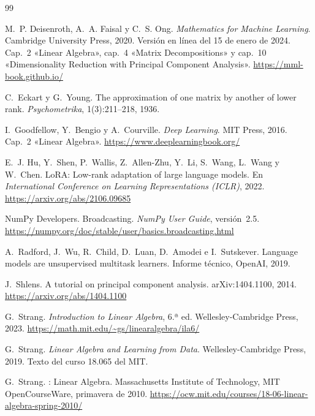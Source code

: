 \begin{thebibliography}{99}
\small

M.~P. Deisenroth, A.~A. Faisal y C.~S. Ong.
\newblock \emph{Mathematics for Machine Learning}.
\newblock Cambridge University Press, 2020. Versión en línea del 15 de enero de 2024.
\newblock Cap.~2 «Linear Algebra», cap.~4 «Matrix Decompositions» y cap.~10 «Dimensionality Reduction with Principal Component Analysis».
\newblock \url{https://mml-book.github.io/}

C.~Eckart y G.~Young.
\newblock The approximation of one matrix by another of lower rank.
\newblock \emph{Psychometrika}, 1(3):211--218, 1936.

I.~Goodfellow, Y.~Bengio y A.~Courville.
\newblock \emph{Deep Learning}.
\newblock MIT Press, 2016. Cap.~2 «Linear Algebra».
\newblock \url{https://www.deeplearningbook.org/}

E.~J. Hu, Y.~Shen, P.~Wallis, Z.~Allen-Zhu, Y.~Li, S.~Wang, L.~Wang y W.~Chen.
\newblock LoRA: Low-rank adaptation of large language models.
\newblock En \emph{International Conference on Learning Representations (ICLR)}, 2022.
\newblock \url{https://arxiv.org/abs/2106.09685}

NumPy Developers.
\newblock Broadcasting. \emph{NumPy User Guide}, versión~2.5.
\newblock \url{https://numpy.org/doc/stable/user/basics.broadcasting.html}

A.~Radford, J.~Wu, R.~Child, D.~Luan, D.~Amodei e I.~Sutskever.
\newblock Language models are unsupervised multitask learners.
\newblock Informe técnico, OpenAI, 2019.

J.~Shlens.
\newblock A tutorial on principal component analysis.
\newblock arXiv:1404.1100, 2014.
\newblock \url{https://arxiv.org/abs/1404.1100}

G.~Strang.
\newblock \emph{Introduction to Linear Algebra}, 6.ª ed.
\newblock Wellesley-Cambridge Press, 2023.
\newblock \url{https://math.mit.edu/~gs/linearalgebra/ila6/}

G.~Strang.
\newblock \emph{Linear Algebra and Learning from Data}.
\newblock Wellesley-Cambridge Press, 2019.
\newblock Texto del curso 18.065 del MIT.

G.~Strang.
: Linear Algebra.
\newblock Massachusetts Institute of Technology, MIT OpenCourseWare, primavera de 2010.
\newblock \url{https://ocw.mit.edu/courses/18-06-linear-algebra-spring-2010/}


\end{thebibliography}
